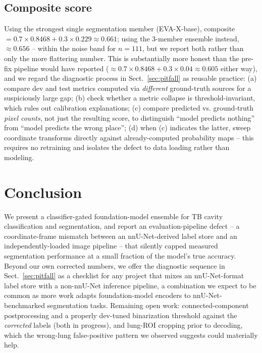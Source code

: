 \documentclass[runningheads]{llncs}
\begin{document}
\subsection{Composite score}

Using the strongest single segmentation member (EVA-X-base), composite $=
0.7 \times 0.8468 + 0.3 \times 0.229 \approx 0.661$; using the 3-member
ensemble instead, $\approx 0.656$ -- within the noise band for $n=111$, but
we report both rather than only the more flattering number. This is
substantially more honest than the pre-fix pipeline would have reported
($\approx 0.7 \times 0.8468 + 0.3 \times 0.04 \approx 0.605$ either way), and
we regard the diagnostic process in
Sect.~\ref{sec:pitfall} as reusable practice: (a) compare dev and test
metrics computed via \emph{different} ground-truth sources for a
suspiciously large gap; (b) check whether a metric collapse is
threshold-invariant, which rules out calibration explanations; (c) compare
predicted vs. ground-truth \emph{pixel counts}, not just the resulting
score, to distinguish ``model predicts nothing'' from ``model predicts the
wrong place''; (d) when (c) indicates the latter, sweep coordinate
transforms directly against already-computed probability maps -- this
requires no retraining and isolates the defect to data loading rather than
modeling.

\section{Conclusion}

We present a classifier-gated foundation-model ensemble for TB cavity
classification and segmentation, and report an evaluation-pipeline defect
-- a coordinate-frame mismatch between an nnU-Net-derived label store and an
independently-loaded image pipeline -- that silently capped measured
segmentation performance at a small fraction of the model's true accuracy.
Beyond our own corrected numbers, we offer the diagnostic sequence in
Sect.~\ref{sec:pitfall} as a checklist for any project that mixes an
nnU-Net-format label store with a non-nnU-Net inference pipeline, a
combination we expect to be common as more work adapts foundation-model
encoders to nnU-Net-benchmarked segmentation tasks. Remaining open work:
connected-component postprocessing and a properly dev-tuned binarization
threshold against the \emph{corrected} labels (both in progress), and lung-ROI
cropping prior to decoding, which the wrong-lung false-positive pattern we
observed suggests could materially help.
\end{document}
